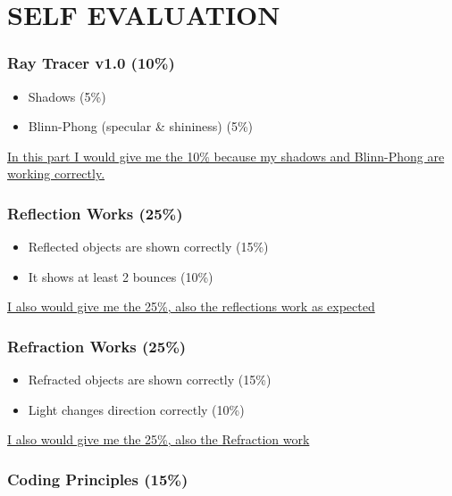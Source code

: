 \documentclass[
]{article}
\begin{document}
\section{SELF EVALUATION}\label{self-evaluation}

\subsubsection{Ray Tracer v1.0 (10\%)}\label{ray-tracer-v1.0-10}

\begin{itemize}
\item
  Shadows (5\%)
\item
  Blinn-Phong (specular \& shininess) (5\%)
\end{itemize}

\ul{In this part I would give me the 10\% because my shadows and
Blinn-Phong are working correctly.}

\subsubsection{Reflection Works (25\%)}\label{reflection-works-25}

\begin{itemize}
\item
  Reflected objects are shown correctly (15\%)
\item
  It shows at least 2 bounces (10\%)
\end{itemize}

\ul{I also would give me the 25\%, also the reflections work as
expected}

\subsubsection{Refraction Works (25\%)}\label{refraction-works-25}

\begin{itemize}
\item
  Refracted objects are shown correctly (15\%)
\item
  Light changes direction correctly (10\%)
\end{itemize}

\ul{I also would give me the 25\%, also the Refraction work}

\subsubsection{Coding Principles (15\%)}\label{coding-principles-15}
\end{document}
